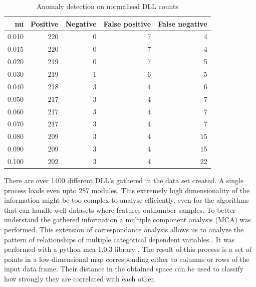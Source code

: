 \documentclass[a4paper,twoside,12pt]{book}
\begin{document}
\begin{table}
	\centering
	\caption{Anomaly detection on normalised DLL counts}
	\label{id:tab:countOCSVM}
	\begin{tabular}{rrrrr}
		\toprule
			nu &  Positive &  Negative &  False positive &  False negative \\
		\midrule
		 0.010 &       220 &         0 &               7 &               4 \\
		 0.015 &       220 &         0 &               7 &               4 \\
		 0.020 &       219 &         0 &               7 &               5 \\
		 0.030 &       219 &         1 &               6 &               5 \\
		 0.040 &       218 &         3 &               4 &               6 \\
		 0.050 &       217 &         3 &               4 &               7 \\
		 0.060 &       217 &         3 &               4 &               7 \\
		 0.070 &       217 &         3 &               4 &               7 \\
		 0.080 &       209 &         3 &               4 &              15 \\
		 0.090 &       209 &         3 &               4 &              15 \\
		 0.100 &       202 &         3 &               4 &              22 \\
		\bottomrule
	\end{tabular}
\end{table}

There are over 1400 different DLL's gathered in the data set created. A single process loads 
even upto 287 modules. This extremely high dimensionality of the information might be too complex 
to analyse efficiently, even for the algorithms that can handle well datasets where features 
outnumber samples. To better understand the gathered information a multiple component 
analysis (MCA) was performed. This extension of correspondance analysis allows us to analyze the 
pattern of relationships of multiple categorical dependent variables \cite{bib:mca}. It was performed 
with a python mca 1.0.3 library \cite{bib:pymca}. The result of this process is a set of points in a 
low-dimensional map corresponding either to columns or rows of the input data frame. Their 
distance in the obtained space can be used to classify how strongly they are correlated with 
each other. 
\end{document}
